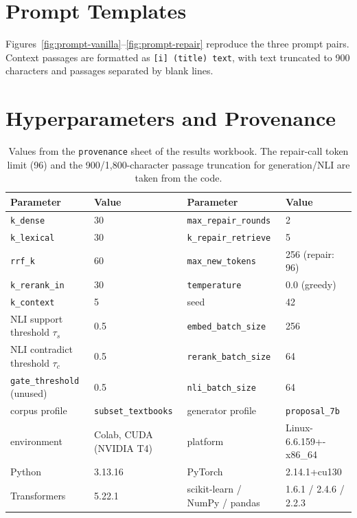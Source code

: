 \documentclass[11pt]{article}
\begin{document}


\appendix
\onecolumn
\section{Prompt Templates}\label{app:prompts}
Figures~\ref{fig:prompt-vanilla}--\ref{fig:prompt-repair} reproduce the three prompt pairs. Context passages are formatted as \texttt{[i] (title) text}, with text truncated to 900 characters and passages separated by blank lines.

\clearpage

\section{Hyperparameters and Provenance}\label{app:hyper}
\begin{table}[h]
\centering\small
\begin{tabular}{ll@{\qquad}ll}
\toprule
Parameter & Value & Parameter & Value \\
\midrule
\texttt{k\_dense} & 30 & \texttt{max\_repair\_rounds} & 2 \\
\texttt{k\_lexical} & 30 & \texttt{k\_repair\_retrieve} & 5 \\
\texttt{rrf\_k} & 60 & \texttt{max\_new\_tokens} & 256 (repair: 96) \\
\texttt{k\_rerank\_in} & 30 & \texttt{temperature} & 0.0 (greedy) \\
\texttt{k\_context} & 5 & seed & 42 \\
NLI support threshold $\tau_s$ & 0.5 & \texttt{embed\_batch\_size} & 256 \\
NLI contradict threshold $\tau_c$ & 0.5 & \texttt{rerank\_batch\_size} & 64 \\
\texttt{gate\_threshold} (unused) & 0.5 & \texttt{nli\_batch\_size} & 64 \\
\midrule
corpus profile & \texttt{subset\_textbooks} & generator profile & \texttt{proposal\_7b} \\
environment & Colab, CUDA (NVIDIA T4) & platform & Linux-6.6.159+-x86\_64 \\
Python & 3.13.16 & PyTorch & 2.14.1+cu130 \\
Transformers & 5.22.1 & scikit-learn / NumPy / pandas & 1.6.1 / 2.4.6 / 2.2.3 \\
\bottomrule
\end{tabular}
\caption{Values from the \texttt{provenance} sheet of the results workbook. The repair-call token limit (96) and the 900/1,800-character passage truncation for generation/NLI are taken from the code.} %
\end{table}
\end{document}
